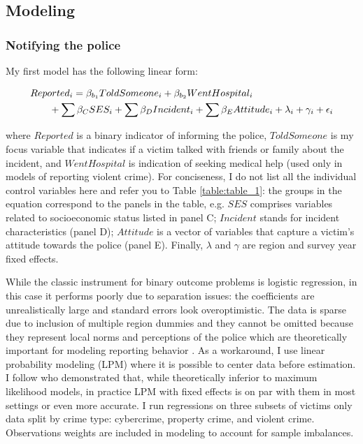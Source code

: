 \documentclass[]{interact}
\theoremstyle{plain}%
\theoremstyle{definition}
\theoremstyle{remark}
\newcommand\citep{\parencite}
\newcommand\citet{\textcite}
\begin{document}
	\subsection*{Modeling} 
	
	\subsubsection*{Notifying the police}
	
	My first model has the following linear form:
	
	\begin{equation}
		\begin{multlined}[0.9\linewidth]
			\label{eq:1}
			\small
			Reported_i = \beta_{b_1} ToldSomeone_i + \beta_{b_2} WentHospital_i 
			\\ + \sum \beta_C SES_i + \sum \beta_D Incident_i + \sum \beta_E Attitude_i + \lambda_i + \gamma_i + \epsilon_i
		\end{multlined}
	\end{equation}

	where $Reported$ is a binary indicator of informing the police, $ToldSomeone$ is my focus variable that indicates if a victim talked with friends or family about the incident, and $WentHospital$ is indication of seeking medical help (used only in models of reporting violent crime). For conciseness, I do not list all the individual control variables here and refer you to Table \ref{table:table_1}: the groups in the equation correspond to the panels in the table, e.g. $SES$ comprises variables related to socioeconomic status listed in panel C; $Incident$ stands for incident characteristics (panel D); $Attitude$ is a vector of variables that capture a victim's attitude towards the police (panel E). Finally, $\lambda$ and $\gamma$ are region and survey year fixed effects.
	
	While the classic instrument for binary outcome problems is logistic regression, in this case it performs poorly due to separation issues: the coefficients are unrealistically large and standard errors look overoptimistic. The data is sparse due to inclusion of multiple region dummies and they cannot be omitted because they represent local norms and perceptions of the police which are theoretically  important for modeling reporting behavior \citep{goudriaan2004reporting, boateng2018crime, ann2010neighborhood}. As a workaround, I use linear probability modeling (LPM) where it is possible to center data before estimation. I follow \citet{timoneda2021estimating} who demonstrated that, while theoretically inferior to maximum likelihood models, in practice LPM with fixed effects is on par with them in most settings or even more accurate. I run regressions on three subsets of victims only data split by crime type: cybercrime, property crime, and violent crime. Observations weights are included in modeling to account for sample imbalances.%
	
\end{document}
